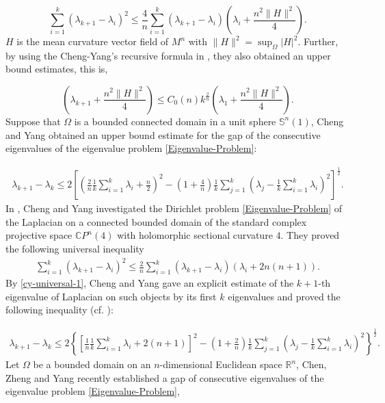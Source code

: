 \documentclass[12pt]{article}
\numberwithin{equation}{section}
\begin{document}
\begin{equation}\label{cc1-ineq}\sum^{k}_{i=1}(\lambda_{k+1}-\lambda_{i})^{2}\leq\frac{4}{n}\sum^{k}_{i=1}(\lambda_{k+1}-\lambda_{i})\left(\lambda_{i}+\frac{n^{2}\|H\|^{2}}{4}\right).\end{equation}
$H$ is the mean curvature vector field of $M^{n}$ with $\|H\|^{2}=\sup_{\Omega}|H|^{2}.$ Further, by using the Cheng-Yang's recursive formula in \cite{CY1}, they also obtained an upper bound estimates, this is,

\begin{equation}\label{cc2-ineq}\left(\lambda_{k+1}+\frac{n^{2}\|H\|^{2}}{4}\right)\leq C_{0}(n)k^{\frac{2}{n}}\left(\lambda_{1}+\frac{n^{2}\|H\|^{2}}{4}\right).\end{equation}
Suppose that $\Omega$ is a bounded connected domain in a unit sphere $\mathbb{S}^{n}(1)$,  Cheng and Yang \cite{CY1} obtained an upper bound estimate for the gap of the consecutive eigenvalues of the eigenvalue problem \eqref{Eigenvalue-Problem}:

\begin{equation*}\begin{aligned}\lambda_{k+1}-\lambda_{k}\leq2\left[\left(
\frac{2}{n}\frac{1}{k}\sum^{k}_{i=1}\lambda_{i}+\frac{n}{2}\right)^{2}-\left(1+\frac{4}{n}\right)\frac{1}{k}\sum^{k}_{j=1}\left(\lambda_{j}
-\frac{1}{k}\sum^{k}_{i=1}\lambda_{i}\right)^{2}\right]^{\frac{1}{2}}.\end{aligned}
\end{equation*} In \cite{CY2}, Cheng and Yang
investigated the Dirichlet  problem \eqref{Eigenvalue-Problem} of
the Laplacian on a connected bounded domain of the standard complex projective space
$\mathbb{C}P^{n}(4)$ with holomorphic sectional curvature $4$. They proved the following universal inequality
\begin{equation}\label{cy-universal-1}\begin{aligned}\sum^{k}_{i=1}\left(\lambda_{k+1}-\lambda_{i}\right)^{2}\leq\frac{2}{n}
\sum^{k}_{i=1}\left(\lambda_{k+1}-\lambda_{i}\right)\left(\lambda_{i}+2n(n+1)\right).\end{aligned}
\end{equation}
By \eqref{cy-universal-1}, Cheng and Yang gave an explicit
estimate of the $k+1$-th eigenvalue of Laplacian on such objects by its first $k$
eigenvalues and proved the following inequality (cf. \cite{CY2}):

\begin{equation}\label{cylk1-lk}\begin{aligned}\lambda_{k+1}-\lambda_{k}\leq
2\left\{\left[\frac{1}{n}\frac{1}{k}\sum^{k}_{i=1}\lambda_{i}+2(n+1)\right]^{2}
-\left(1+\frac{2}{n}\right)\frac{1}{k}\sum^{k}_{j=1}\left(\lambda_{j}-\frac{1}{k}\sum^{k}_{i=1}\lambda_{i}\right)^{2}\right\}^{\frac{1}{2}}.\end{aligned}
\end{equation}Let $\Omega$ be a bounded domain on an $n$-dimensional Euclidean space $\mathbb{R}^{n}$, Chen, Zheng and Yang \cite{CZY} recently established a gap of consecutive
eigenvalues of the eigenvalue problem \eqref{Eigenvalue-Problem},
\end{document}
